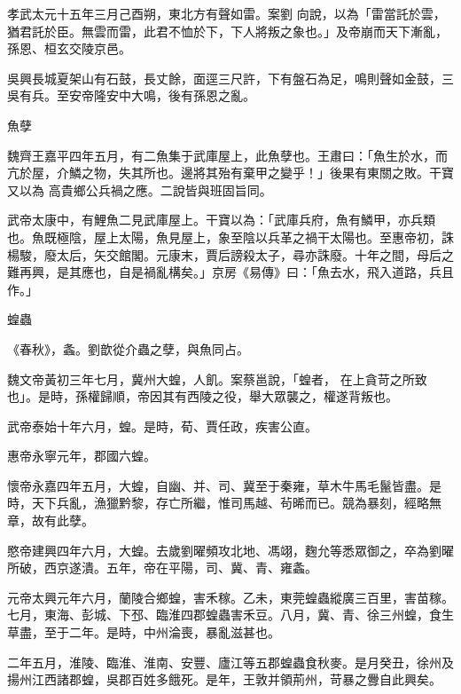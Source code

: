 \begin{pinyinscope}
 孝武太元十五年三月己酉朔，東北方有聲如雷。案劉
 向說，以為「雷當託於雲，猶君託於臣。無雲而雷，此君不恤於下，下人將叛之象也。」及帝崩而天下漸亂，孫恩、桓玄交陵京邑。



 吳興長城夏架山有石鼓，長丈餘，面逕三尺許，下有盤石為足，鳴則聲如金鼓，三吳有兵。至安帝隆安中大鳴，後有孫恩之亂。



 魚孽



 魏齊王嘉平四年五月，有二魚集于武庫屋上，此魚孽也。王肅曰：「魚生於水，而亢於屋，介鱗之物，失其所也。邊將其殆有棄甲之變乎！」後果有東關之敗。干寶又以為
 高貴鄉公兵禍之應。二說皆與班固旨同。



 武帝太康中，有鯉魚二見武庫屋上。干寶以為：「武庫兵府，魚有鱗甲，亦兵類也。魚既極陰，屋上太陽，魚見屋上，象至陰以兵革之禍干太陽也。至惠帝初，誅楊駿，廢太后，矢交館閣。元康末，賈后謗殺太子，尋亦誅廢。十年之間，母后之難再興，是其應也，自是禍亂構矣。」京房《易傳》曰：「魚去水，飛入道路，兵且作。」



 蝗蟲



 《春秋》，螽。劉歆從介蟲之孽，與魚同占。



 魏文帝黃初三年七月，冀州大蝗，人飢。案蔡邕說，「蝗者，
 在上貪苛之所致也」。是時，孫權歸順，帝因其有西陵之役，舉大眾襲之，權遂背叛也。



 武帝泰始十年六月，蝗。是時，荀、賈任政，疾害公直。



 惠帝永寧元年，郡國六蝗。



 懷帝永嘉四年五月，大蝗，自幽、并、司、冀至于秦雍，草木牛馬毛鬣皆盡。是時，天下兵亂，漁獵黔黎，存亡所繼，惟司馬越、茍晞而已。競為暴刻，經略無章，故有此孽。



 愍帝建興四年六月，大蝗。去歲劉曜頻攻北地、馮翊，麴允等悉眾御之，卒為劉曜所破，西京遂潰。五年，帝在平陽，司、冀、青、雍螽。



 元帝太興元年六月，蘭陵合鄉蝗，害禾稼。乙未，東莞蝗蟲縱廣三百里，害苗稼。七月，東海、彭城、下邳、臨淮四郡蝗蟲害禾豆。八月，冀、青、徐三州蝗，食生草盡，至于二年。是時，中州淪喪，暴亂滋甚也。



 二年五月，淮陵、臨淮、淮南、安豐、廬江等五郡蝗蟲食秋麥。是月癸丑，徐州及揚州江西諸郡蝗，吳郡百姓多餓死。是年，王敦并領荊州，苛暴之釁自此興矣。




\end{pinyinscope}
